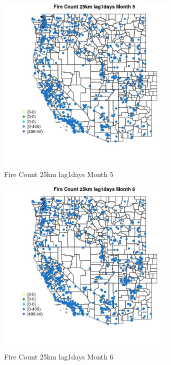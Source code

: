 \begin{figure} 
\centering  
\includegraphics[width=0.77\textwidth]{Code_Outputs/Report_ML_input_PM25_Step4_part_f_de_duplicated_aves_prioritize_24hr_obswNAs_MapObsMo5Fire_Count_25km_lag1days.jpg} 
\caption{\label{fig:Report_ML_input_PM25_Step4_part_f_de_duplicated_aves_prioritize_24hr_obswNAsMapObsMo5Fire_Count_25km_lag1days}Fire Count 25km lag1days Month 5} 
\end{figure} 
 

\begin{figure} 
\centering  
\includegraphics[width=0.77\textwidth]{Code_Outputs/Report_ML_input_PM25_Step4_part_f_de_duplicated_aves_prioritize_24hr_obswNAs_MapObsMo6Fire_Count_25km_lag1days.jpg} 
\caption{\label{fig:Report_ML_input_PM25_Step4_part_f_de_duplicated_aves_prioritize_24hr_obswNAsMapObsMo6Fire_Count_25km_lag1days}Fire Count 25km lag1days Month 6} 
\end{figure} 
 

